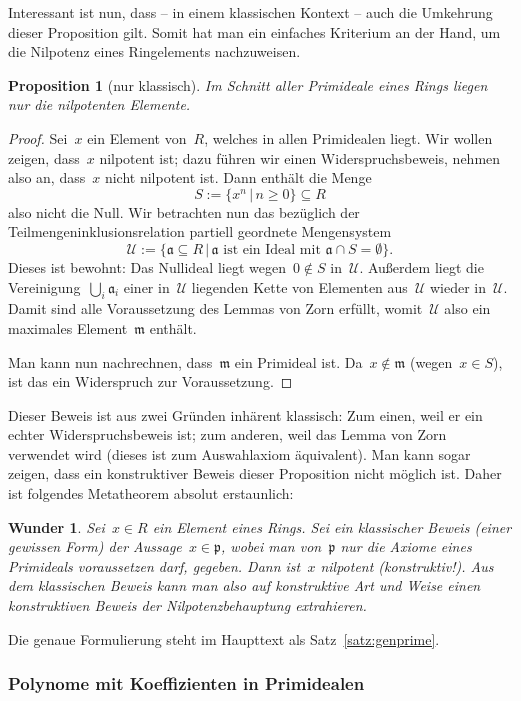 \documentclass[a4paper,ngerman,12pt]{scrartcl}
\theoremstyle{definition}
\theoremstyle{plain}
\newtheorem{prop}[defn]{Proposition}
\newtheorem{wunder}[defn]{Wunder}
\theoremstyle{remark}
\renewcommand{\aa}{\mathfrak{a}}
\newcommand{\pp}{\mathfrak{p}}
\newcommand{\mm}{\mathfrak{m}}
\newcommand{\U}{\mathcal{U}}
\renewcommand{\_}{\mathpunct{.}\,}
\newcommand{\?}{\,{:}\,}
\begin{document}
Interessant ist nun, dass -- in einem klassischen Kontext -- auch die Umkehrung
dieser Proposition gilt. Somit hat man ein einfaches Kriterium an der Hand, um
die Nilpotenz eines Ringelements nachzuweisen.

\begin{prop}[nur klassisch]\label{intersectprim}%
Im Schnitt aller Primideale eines Rings liegen nur
die nilpotenten Elemente.\end{prop}
\begin{proof}Sei~$x$ ein Element von~$R$, welches in allen Primidealen liegt.
Wir wollen zeigen, dass~$x$ nilpotent ist; dazu führen wir einen
Widerspruchsbeweis, nehmen also an, dass~$x$ nicht nilpotent ist. Dann enthält
die Menge
\[ S := \{ x^n \,|\, n \geq 0 \} \subseteq R \]
also nicht die Null. Wir betrachten nun das bezüglich der
Teilmengeninklusionsrelation partiell geordnete Mengensystem
\[ \U := \{ \aa \subseteq R \,|\, \text{$\aa$ ist ein Ideal mit~$\aa \cap S =
\emptyset$} \}. \]
Dieses ist bewohnt: Das Nullideal liegt wegen~$0 \not\in S$ in~$\U$. Außerdem
liegt die Vereinigung~$\bigcup_i \aa_i$ einer in~$\U$ liegenden Kette von
Elementen aus~$\U$ wieder in~$\U$. Damit sind alle Voraussetzung des Lemmas von
Zorn erfüllt, womit~$\U$ also ein maximales Element~$\mm$ enthält.

Man kann nun nachrechnen, dass~$\mm$ ein Primideal ist. Da~$x \not\in \mm$
(wegen~$x \in S$), ist das ein Widerspruch zur Voraussetzung.
\end{proof}

Dieser Beweis ist aus zwei Gründen inhärent klassisch: Zum einen, weil
er ein echter Widerspruchsbeweis ist; zum anderen, weil das Lemma von Zorn
verwendet wird (dieses ist zum Auswahlaxiom äquivalent). Man kann sogar zeigen,
dass ein konstruktiver Beweis dieser Proposition nicht möglich ist. Daher
ist folgendes Metatheorem absolut erstaunlich:

\begin{wunder}Sei~$x \in R$ ein Element eines Rings. Sei ein \emph{klassischer
Beweis} (einer gewissen Form) der Aussage~$x \in \pp$, wobei man von~$\pp$ nur
die Axiome eines Primideals voraussetzen darf, gegeben. Dann ist~$x$ nilpotent
(konstruktiv!). Aus dem klassischen Beweis kann man also auf konstruktive Art
und Weise einen konstruktiven Beweis der Nilpotenzbehauptung extrahieren.
\end{wunder}

Die genaue Formulierung steht im Haupttext als Satz~\ref{satz:genprime}.


\subsubsection*{Polynome mit Koeffizienten in Primidealen}
\end{document}
